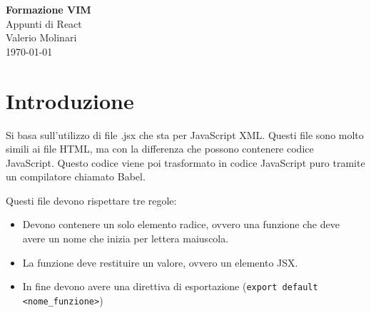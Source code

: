\documentclass[12pt]{article}
\begin{document}
\begin{titlepage}
\begin{center}
\vspace*{3cm}
\Huge\textcolor{primary}{\textbf{Formazione VIM}} \\[1cm]
\Large\textcolor{secondary}{Appunti di React} \\[1cm]
\textcolor{accent}{Valerio Molinari}\\
\vfill
\today
\end{center}
\end{titlepage}

\tableofcontents
\newpage

\section{Introduzione}
Si basa sull'utilizzo di file .jsx che sta per JavaScript XML. 
Questi file sono molto simili ai file HTML, 
ma con la differenza che possono contenere codice JavaScript. 
Questo codice viene poi trasformato in codice JavaScript puro 
tramite un compilatore chiamato Babel.

Questi file devono rispettare tre regole:
\begin{itemize}
    \item Devono contenere un solo elemento radice, ovvero una funzione
    che deve avere un nome che inizia per lettera maiuscola.
    \item La funzione deve restituire un valore, ovvero un elemento JSX.
    \item In fine devono avere una direttiva di esportazione 
    ({\tt export default <nome\_funzione>})
\end{itemize}
\end{document}
